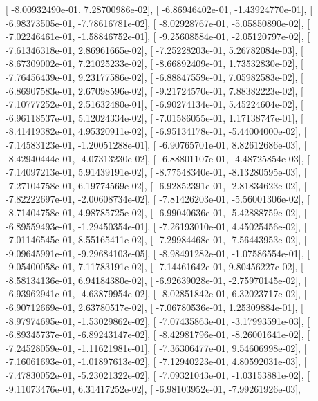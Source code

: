 \documentclass{article}
\begin{document}
       [ -8.00932490e-01,   7.28700986e-02],
       [ -6.86946402e-01,  -1.43924770e-01],
       [ -6.98373505e-01,  -7.78616781e-02],
       [ -8.02928767e-01,  -5.05850890e-02],
       [ -7.02246461e-01,  -1.58846752e-01],
       [ -9.25608584e-01,  -2.05120797e-02],
       [ -7.61346318e-01,   2.86961665e-02],
       [ -7.25228203e-01,   5.26782084e-03],
       [ -8.67309002e-01,   7.21025233e-02],
       [ -8.66892409e-01,   1.73532830e-02],
       [ -7.76456439e-01,   9.23177586e-02],
       [ -6.88847559e-01,   7.05982583e-02],
       [ -6.86907583e-01,   2.67098596e-02],
       [ -9.21724570e-01,   7.88382223e-02],
       [ -7.10777252e-01,   2.51632480e-01],
       [ -6.90274134e-01,   5.45224604e-02],
       [ -6.96118537e-01,   5.12024334e-02],
       [ -7.01586055e-01,   1.17138747e-01],
       [ -8.41419382e-01,   4.95320911e-02],
       [ -6.95134178e-01,  -5.44004000e-02],
       [ -7.14583123e-01,  -1.20051288e-01],
       [ -6.90765701e-01,   8.82612686e-03],
       [ -8.42940444e-01,  -4.07313230e-02],
       [ -6.88801107e-01,  -4.48725854e-03],
       [ -7.14097213e-01,   5.91439191e-02],
       [ -8.77548340e-01,  -8.13280595e-03],
       [ -7.27104758e-01,   6.19774569e-02],
       [ -6.92852391e-01,  -2.81834623e-02],
       [ -7.82222697e-01,  -2.00608734e-02],
       [ -7.81426203e-01,  -5.56001306e-02],
       [ -8.71404758e-01,   4.98785725e-02],
       [ -6.99040636e-01,  -5.42888759e-02],
       [ -6.89559493e-01,  -1.29450354e-01],
       [ -7.26193010e-01,   4.45025456e-02],
       [ -7.01146545e-01,   8.55165411e-02],
       [ -7.29984468e-01,  -7.56443953e-02],
       [ -9.09645991e-01,  -9.29684103e-05],
       [ -8.98491282e-01,  -1.07586554e-01],
       [ -9.05400058e-01,   7.11783191e-02],
       [ -7.14461642e-01,   9.80456227e-02],
       [ -8.58134136e-01,   6.94184380e-02],
       [ -6.92639028e-01,  -2.75970145e-02],
       [ -6.93962941e-01,  -4.63879954e-02],
       [ -8.02851842e-01,   6.32023717e-02],
       [ -6.90712669e-01,   2.63780517e-02],
       [ -7.06780536e-01,   1.25309884e-01],
       [ -8.97974695e-01,  -1.53029862e-02],
       [ -7.07435863e-01,  -3.17993591e-03],
       [ -6.89345737e-01,  -6.89243147e-02],
       [ -8.42981796e-01,  -8.26001641e-02],
       [ -7.24528059e-01,  -1.11621981e-01],
       [ -7.36306477e-01,   9.54606998e-02],
       [ -7.16061693e-01,  -1.01897613e-02],
       [ -7.12940223e-01,   4.80592031e-03],
       [ -7.47830052e-01,  -5.23021322e-02],
       [ -7.09321043e-01,  -1.03153881e-02],
       [ -9.11073476e-01,   6.31417252e-02],
       [ -6.98103952e-01,  -7.99261926e-03],
\end{document}
